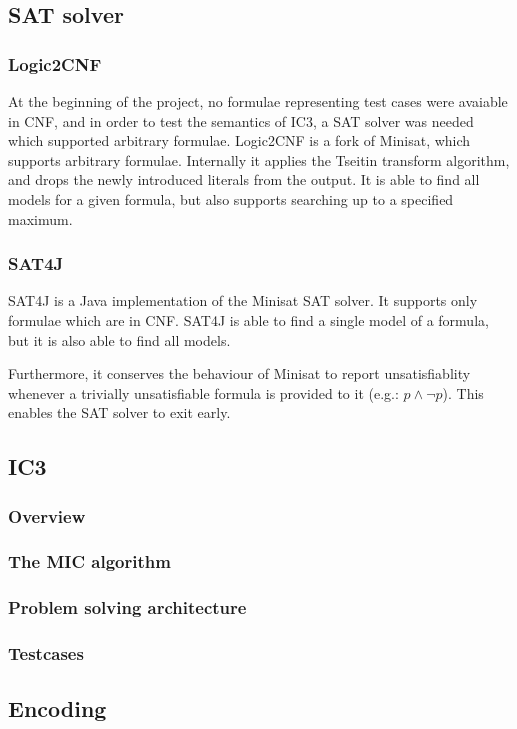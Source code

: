 \documentclass[a4paper]{article}
\begin{document}
\subsection{SAT solver}
\subsubsection{Logic2CNF}
At the beginning of the project, no formulae representing test cases were avaiable in CNF, and in order to test the semantics of IC3, a SAT solver was needed which supported arbitrary formulae. Logic2CNF is a fork of Minisat, which supports arbitrary formulae. Internally it applies the Tseitin transform algorithm, and drops the newly introduced literals from the output. It is able to find all models for a given formula, but also supports searching up to a specified maximum.

\subsubsection{SAT4J}
SAT4J is a Java implementation of the Minisat SAT solver. It supports only formulae which are in CNF. SAT4J is able to find a single model of a formula, but it is also able to find all models.

Furthermore, it conserves the behaviour of Minisat to report unsatisfiablity whenever a trivially unsatisfiable formula is provided to it (e.g.: $p \land \lnot p$). This enables the SAT solver to exit early.

\subsection{IC3}
\subsubsection{Overview}
\subsubsection{The MIC algorithm}
\subsubsection{Problem solving architecture}
\subsubsection{Testcases}

\subsection{Encoding} %
\end{document}
